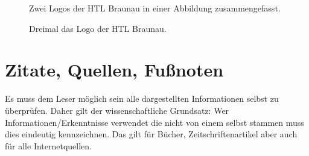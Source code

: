 
\begin{figure}[H]
  \centering
  \qquad
  \label{fig:canvas_01}
  \caption[Zwei Logos der HTL Braunau]{Zwei Logos der HTL Braunau in einer Abbildung zusammengefasst.}
\end{figure}


\begin{figure}[H]
  \centering
  \qquad
\qquad
  \label{fig:canvas_04}
\caption[Drei Logos der HTL Braunau]{Dreimal das Logo der HTL Braunau.}
\end{figure}


\section{Zitate, Quellen, Fußnoten}

Es muss dem Leser möglich sein alle dargestellten Informationen selbst zu überprüfen.
Daher gilt der wissenschaftliche Grundsatz: 
Wer Informationen/Erkenntnisse verwendet die nicht von einem selbst stammen muss dies eindeutig kennzeichnen.
Das gilt für Bücher, Zeitschriftenartikel aber auch für alle Internetquellen.

